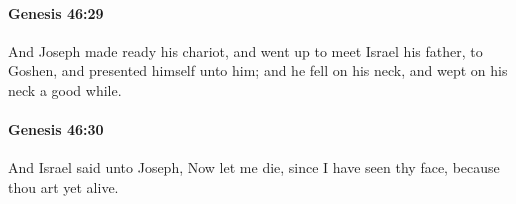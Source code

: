 		\paragraph{Genesis 46:29} %
			\label{GENESIS-46-29}

			And Joseph made ready his chariot, and went up to meet Israel his father, to Goshen, and presented himself unto him; and he fell on his neck, and wept on his neck a good while.


		\paragraph{Genesis 46:30} %
			\label{GENESIS-46-30}

			And Israel said unto Joseph, Now let me die, since I have seen thy face, because thou art yet alive.


